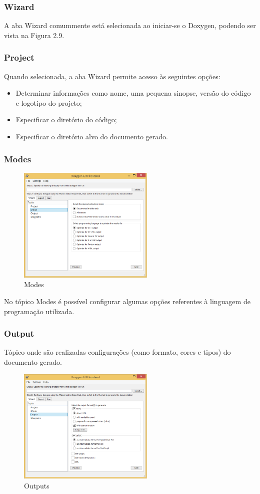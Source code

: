 \subsubsection{Wizard}
A aba Wizard comummente está selecionada ao iniciar-se o Doxygen, podendo ser vista na Figura 2.9. 
\subsubsection{Project}
Quando selecionada, a aba Wizard permite acesso às seguintes opções:
\begin{itemize}
\item  Determinar informações como nome, uma pequena sinopse, versão do código e logotipo do projeto;
\item  Especificar o diretório do código;
\item  Especificar o diretório alvo do documento gerado.
\end{itemize}
\subsubsection{Modes}
\begin{figure}[!htb]
\centering
\includegraphics[width=6.5cm]{./include/chapters/sections/soft/section4/img/mode.png}
\caption{Modes}
\end{figure}
No tópico Modes é possível configurar algumas opções referentes à linguagem de programação utilizada.
\subsubsection{Output}
Tópico onde são realizadas configurações (como formato, cores e tipos) do documento gerado.
\begin{figure}[!htb]
\centering
\includegraphics[width=6.5cm]{./include/chapters/sections/soft/section4/img/output.png}
\caption{Outputs}
\end{figure}

